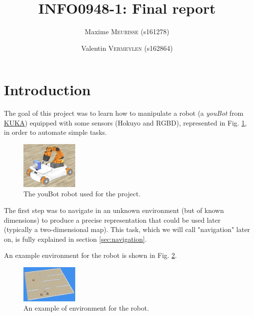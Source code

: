 \documentclass[a4paper, 10pt, conference]{ieeeconf}
\title{INFO0948-1: Final report}
\author{Maxime \textsc{Meurisse} (s161278) \and Valentin \textsc{Vermeylen} (s162864)}
\begin{document}
    
    \maketitle
    \thispagestyle{plain}
    \pagestyle{plain}
    
    
    \section{Introduction}
    
    The goal of this project was to learn how to manipulate a robot (a \emph{youBot} from \href{https://www.kuka.com/}{KUKA}) equipped with some sensors (Hokuyo and RGBD), represented in Fig. \ref{fig:introduction.youbot}, in order to automate simple tasks.
    
    \begin{figure}[!h]
        \centering
        \includegraphics[width=0.25\textwidth]{resources/png/youbot.png}
        \caption{The youBot robot used for the project.}
        \label{fig:introduction.youbot}
    \end{figure}
    
    The first step was to navigate in an unknown environment (but of known dimensions) to produce a precise representation that could be used later (typically a two-dimensional map). This task, which we will call "navigation" later on, is fully explained in section \ref{sec:navigation}.
    
    An example environment for the robot is shown in Fig. \ref{fig:introduction.environment}.
    
    \begin{figure}[!h]
        \centering
        \includegraphics[width=0.25\textwidth]{resources/png/environment.png}
        \caption{An example of environment for the robot.}
        \label{fig:introduction.environment}
    \end{figure}
    
\end{document}
